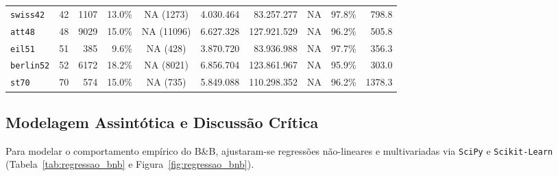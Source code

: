 \begin{table}[htbp]
{\begin{tabular}{l|c|r|r|c|r|r|r|r|r}
\texttt{swiss42}   & 42 & 1107 & 13.0\% & NA (1273)    & 4.030.464   & 83.257.277  & NA    & 97.8\% & 798.8   \\
\texttt{att48}     & 48 & 9029 & 15.0\% & NA (11096)   & 6.627.328   & 127.921.529 & NA    & 96.2\% & 505.8   \\
\texttt{eil51}     & 51 & 385  & 9.6\%  & NA (428)     & 3.870.720   & 83.936.988  & NA    & 97.7\% & 356.3   \\
\texttt{berlin52}  & 52 & 6172 & 18.2\% & NA (8021)    & 6.856.704   & 123.861.967 & NA    & 95.9\% & 303.0   \\
\texttt{st70}      & 70 & 574  & 15.0\% & NA (735)     & 5.849.088   & 110.298.352 & NA    & 96.2\% & 1378.3  \\ \hline
\end{tabular}%
}
\end{table}

\subsection{Modelagem Assintótica e Discussão Crítica}

Para modelar o comportamento empírico do B\&B, ajustaram-se regressões não-lineares e multivariadas via \texttt{SciPy} e \texttt{Scikit-Learn} (Tabela~\ref{tab:regressao_bnb} e Figura~\ref{fig:regressao_bnb}).

\begin{table}[htbp]
\centering
\caption{Modelagem de complexidade empírica do Branch-and-Bound.}
\label{tab:regressao_bnb}
\end{table}

